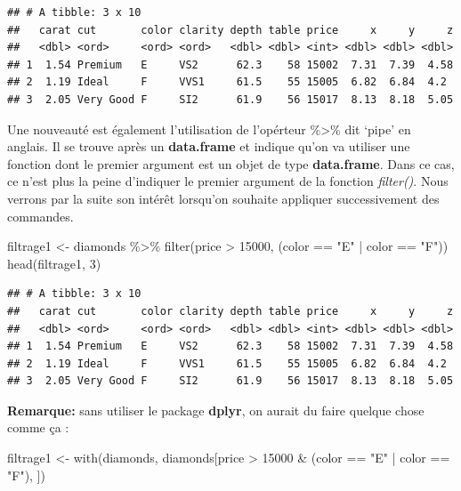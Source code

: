 \documentclass[
]{book}
\newenvironment{Shaded}{\begin{snugshade}}{\end{snugshade}}
\newcommand{\DecValTok}[1]{\textcolor[rgb]{0.00,0.00,0.81}{#1}}
\newcommand{\FunctionTok}[1]{\textcolor[rgb]{0.00,0.00,0.00}{#1}}
\newcommand{\NormalTok}[1]{#1}
\newcommand{\OtherTok}[1]{\textcolor[rgb]{0.56,0.35,0.01}{#1}}
\newcommand{\SpecialCharTok}[1]{\textcolor[rgb]{0.00,0.00,0.00}{#1}}
\newcommand{\StringTok}[1]{\textcolor[rgb]{0.31,0.60,0.02}{#1}}
\theoremstyle{definition}
\theoremstyle{definition}
\theoremstyle{definition}
\theoremstyle{definition}
\theoremstyle{remark}
\begin{document}
\begin{verbatim}
## # A tibble: 3 x 10
##   carat cut       color clarity depth table price     x     y     z
##   <dbl> <ord>     <ord> <ord>   <dbl> <dbl> <int> <dbl> <dbl> <dbl>
## 1  1.54 Premium   E     VS2      62.3    58 15002  7.31  7.39  4.58
## 2  1.19 Ideal     F     VVS1     61.5    55 15005  6.82  6.84  4.2 
## 3  2.05 Very Good F     SI2      61.9    56 15017  8.13  8.18  5.05
\end{verbatim}

Une nouveauté est également l'utilisation de l'opérteur \%\textgreater\% dit `pipe' en anglais. Il se trouve après un \textbf{data.frame} et indique qu'on va utiliser une fonction dont le premier argument est un objet de type \textbf{data.frame}. Dans ce cas, ce n'est plus la peine d'indiquer le premier argument de la fonction \emph{filter()}. Nous verrons par la suite son intérêt lorsqu'on souhaite appliquer successivement des commandes.

\begin{Shaded}
\begin{Highlighting}[]
\NormalTok{filtrage1 }\OtherTok{\textless{}{-}}\NormalTok{ diamonds }\SpecialCharTok{\%\textgreater{}\%} 
  \FunctionTok{filter}\NormalTok{(price }\SpecialCharTok{\textgreater{}} \DecValTok{15000}\NormalTok{, (color }\SpecialCharTok{==} \StringTok{"E"} \SpecialCharTok{|}\NormalTok{ color }\SpecialCharTok{==} \StringTok{"F"}\NormalTok{))}
\FunctionTok{head}\NormalTok{(filtrage1, }\DecValTok{3}\NormalTok{)}
\end{Highlighting}
\end{Shaded}

\begin{verbatim}
## # A tibble: 3 x 10
##   carat cut       color clarity depth table price     x     y     z
##   <dbl> <ord>     <ord> <ord>   <dbl> <dbl> <int> <dbl> <dbl> <dbl>
## 1  1.54 Premium   E     VS2      62.3    58 15002  7.31  7.39  4.58
## 2  1.19 Ideal     F     VVS1     61.5    55 15005  6.82  6.84  4.2 
## 3  2.05 Very Good F     SI2      61.9    56 15017  8.13  8.18  5.05
\end{verbatim}

\textbf{Remarque:} sans utiliser le package \textbf{dplyr}, on aurait du faire quelque chose comme ça :

\begin{Shaded}
\begin{Highlighting}[]
\NormalTok{filtrage1 }\OtherTok{\textless{}{-}} \FunctionTok{with}\NormalTok{(diamonds, diamonds[price }\SpecialCharTok{\textgreater{}} \DecValTok{15000} \SpecialCharTok{\&} 
\NormalTok{                                       (color }\SpecialCharTok{==} \StringTok{"E"} \SpecialCharTok{|}\NormalTok{ color }\SpecialCharTok{==} \StringTok{"F"}\NormalTok{), ])}
\end{Highlighting}
\end{Shaded}
\end{document}
